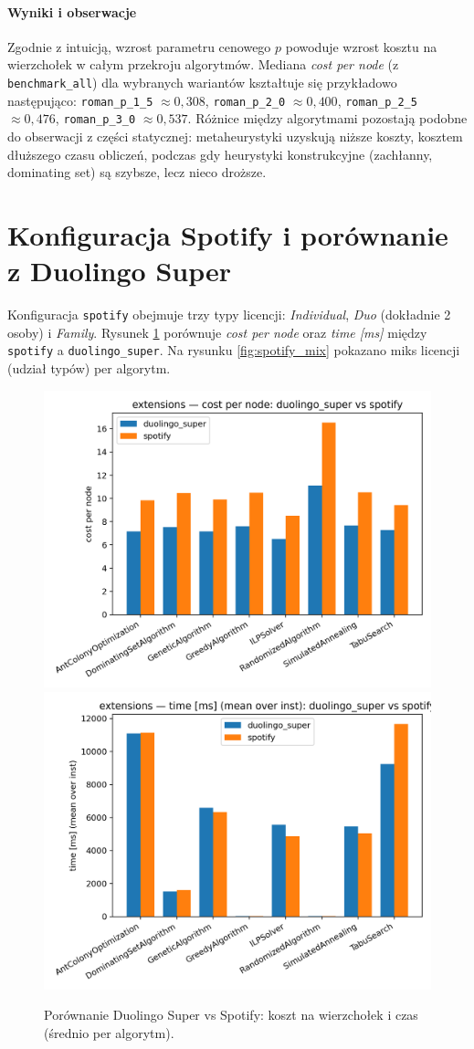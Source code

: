 \paragraph{Wyniki i obserwacje}
Zgodnie z intuicją, wzrost parametru cenowego $p$ powoduje wzrost kosztu na wierzchołek w całym przekroju algorytmów. Mediana \textit{cost per node} (z \texttt{benchmark\_all}) dla wybranych wariantów kształtuje się przykładowo następująco: \texttt{roman\_p\_1\_5} $\approx0{,}308$, \texttt{roman\_p\_2\_0} $\approx0{,}400$, \texttt{roman\_p\_2\_5} $\approx0{,}476$, \texttt{roman\_p\_3\_0} $\approx0{,}537$. Różnice między algorytmami pozostają podobne do obserwacji z części statycznej: metaheurystyki uzyskują niższe koszty, kosztem dłuższego czasu obliczeń, podczas gdy heurystyki konstrukcyjne (zachłanny, dominating set) są szybsze, lecz nieco droższe.

\section{Konfiguracja Spotify i porównanie z Duolingo Super}

Konfiguracja \texttt{spotify} obejmuje trzy typy licencji: \emph{Individual}, \emph{Duo} (dokładnie 2 osoby) i \emph{Family}. Rysunek \ref{fig:duo_spotify_cmp} porównuje \textit{cost per node} oraz \textit{time [ms]} między \texttt{spotify} a \texttt{duolingo\_super}. Na rysunku \ref{fig:spotify_mix} pokazano miks licencji (udział typów) per algorytm.

\begin{figure}[H]
  \centering
  \includegraphics[width=0.48\linewidth]{assets/figures/extensions/duo_vs_spotify/compare_cost_per_node_duolingo_super_vs_spotify.png}
  \includegraphics[width=0.48\linewidth]{assets/figures/extensions/duo_vs_spotify/compare_time_ms_duolingo_super_vs_spotify.png}
\caption{Porównanie Duolingo Super vs Spotify: koszt na wierzchołek i czas (średnio per algorytm).}
  \label{fig:duo_spotify_cmp}
\end{figure}

